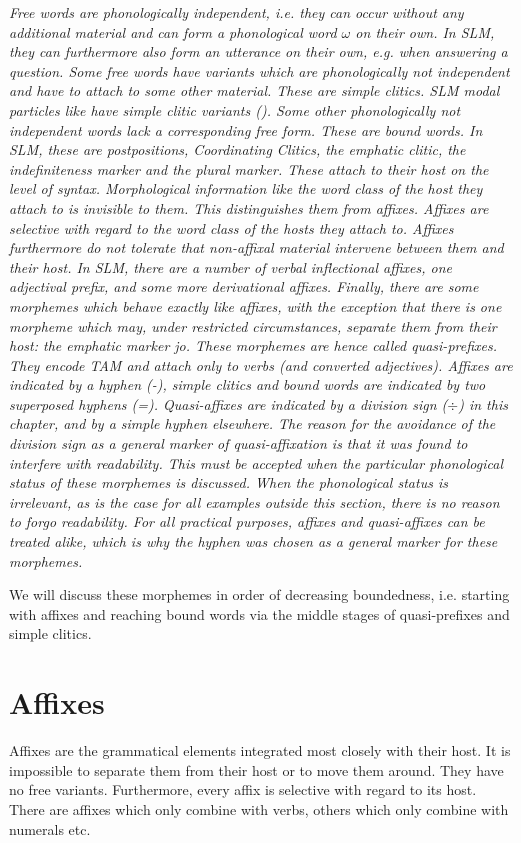 \em Free words \em are phonologically independent, i.e. they can occur without any additional material and can form a phonological word $\omega$ \citep{NesporEtAl1986} on their own. In SLM, they can furthermore also form an utterance on their own, e.g. when answering a question.
Some free words have variants which are phonologically not independent and have to attach to some other material. These are \em simple clitics\em. SLM modal particles like  have simple clitic variants (). Some other phonologically not independent  words lack a corresponding free form. These are \em bound words\em. In SLM, these are postpositions, Coordinating Clitics, the emphatic clitic, the indefiniteness marker and the plural marker. These attach to their host on the level of syntax. Morphological information like the word class of the host they attach to is invisible to them. This distinguishes them from \em affixes\em. Affixes are selective with regard to the word class of the hosts they  attach to. Affixes furthermore do not tolerate that non-affixal material intervene between them and their host. In SLM, there are a number of verbal inflectional affixes, one adjectival prefix, and some more derivational affixes. Finally, there are some morphemes which behave exactly like affixes, with the exception that there is one morpheme which may, under restricted circumstances, separate them from their host: the emphatic marker \em jo\em. These morphemes are hence called \em quasi-prefixes\em. They encode TAM and attach only to verbs (and converted adjectives). Affixes are indicated by a hyphen (-), simple clitics and bound words are indicated by two superposed hyphens (=). Quasi-affixes are indicated by a division  sign ($\div$) in this chapter, and by a simple hyphen elsewhere. The reason for the avoidance of the division sign as a general marker of quasi-affixation is that it was found to interfere with readability. This must be accepted when the particular phonological status of these morphemes is discussed. When the phonological status is irrelevant, as is the case for all examples outside this section, there is no reason to forgo readability. For all practical purposes, affixes and quasi-affixes can be treated alike, which is why the hyphen was chosen as a general marker for these morphemes.

We will discuss these morphemes in order of decreasing boundedness, i.e. starting with affixes and reaching bound words via the middle stages of quasi-prefixes and simple clitics.

\section{Affixes}\label{sec:morph:Affixes}
Affixes are the grammatical elements integrated most closely with their host. It is impossible to separate them from their host or to move them around. They have no free variants. Furthermore, every affix is selective with regard to its host. There are affixes which only combine with verbs, others which only combine  with numerals etc.

